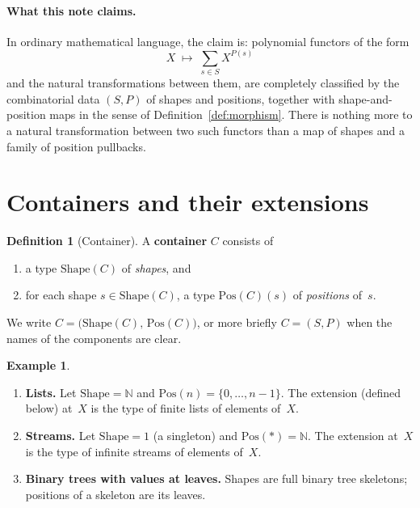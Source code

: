 \documentclass[11pt,a4paper]{article}
\theoremstyle{plain}
\theoremstyle{definition}
\newtheorem{definition}[theorem]{Definition}
\newtheorem{example}[theorem]{Example}
\newcommand{\Shape}{\mathrm{Shape}}
\newcommand{\Pos}{\mathrm{Pos}}
\begin{document}
\paragraph{What this note claims.}
In ordinary mathematical language, the claim is: polynomial functors of the
form
\[
  X \;\longmapsto\; \sum_{s \in S} X^{P(s)}
\]
and the natural transformations between them, are completely classified by
the combinatorial data $(S,P)$ of shapes and positions, together with
shape-and-position maps in the sense of Definition~\ref{def:morphism}. There
is nothing more to a natural transformation between two such functors than a
map of shapes and a family of position pullbacks.

\section{Containers and their extensions}

\begin{definition}[Container]\label{def:container}
A \textbf{container} $C$ consists of
\begin{enumerate}
  \item a type $\Shape(C)$ of \emph{shapes}, and
  \item for each shape $s \in \Shape(C)$, a type $\Pos(C)(s)$ of
        \emph{positions} of~$s$.
\end{enumerate}
We write $C = \bigl(\Shape(C),\, \Pos(C)\bigr)$, or more briefly $C = (S,P)$
when the names of the components are clear.
\end{definition}

\begin{example}
\begin{enumerate}
  \item \textbf{Lists.} Let $\Shape = \mathbb{N}$ and $\Pos(n) = \{0,\ldots,n-1\}$.
        The extension (defined below) at~$X$ is the type of finite lists of
        elements of~$X$.
  \item \textbf{Streams.} Let $\Shape = 1$ (a singleton) and $\Pos(\ast) =
        \mathbb{N}$. The extension at~$X$ is the type of infinite streams of
        elements of~$X$.
  \item \textbf{Binary trees with values at leaves.} Shapes are full binary
        tree skeletons; positions of a skeleton are its leaves.
\end{enumerate}
\end{example}
\end{document}
